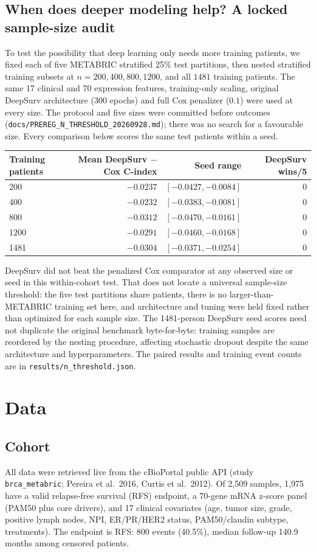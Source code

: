\documentclass[12pt,a4paper]{article}
\begin{document}
\subsection{When does deeper modeling help? A locked sample-size audit}
To test the possibility that deep learning only needs more training patients,
we fixed each of five METABRIC stratified 25\% test partitions, then nested
stratified training subsets at $n=200,400,800,1200$, and all $1481$
training patients. The same 17 clinical and 70 expression features,
training-only scaling, original DeepSurv architecture (300 epochs) and
full Cox penalizer ($0.1$) were used at every size. The protocol and five
sizes were committed before outcomes
(\texttt{docs/PREREG\_N\_THRESHOLD\_20260928.md}); there was no search
for a favourable size. Every comparison below scores the same test patients
within a seed.
\begin{center}
\begin{tabular}{lrrr}
Training patients & Mean DeepSurv $-$ Cox C-index & Seed range & DeepSurv wins/5\\
\hline
200 & $-0.0237$ & $[-0.0427,-0.0084]$ & 0\\
400 & $-0.0232$ & $[-0.0383,-0.0081]$ & 0\\
800 & $-0.0312$ & $[-0.0470,-0.0161]$ & 0\\
1200 & $-0.0291$ & $[-0.0460,-0.0168]$ & 0\\
1481 & $-0.0304$ & $[-0.0371,-0.0254]$ & 0\\
\end{tabular}
\end{center}
DeepSurv did not beat the penalized Cox comparator at any observed size or
seed in this within-cohort test. That does not locate a universal
sample-size threshold: the five test partitions share patients, there is
no larger-than-METABRIC training set here, and architecture and tuning were
held fixed rather than optimized for each sample size. The 1481-person
DeepSurv seed scores need not duplicate the original benchmark byte-for-byte:
training samples are reordered by the nesting procedure, affecting stochastic
dropout despite the same architecture and hyperparameters. The paired
results and training event counts are in \texttt{results/n\_threshold.json}.

\section{Data}
\subsection{Cohort}
All data were retrieved live from the cBioPortal public API (study
\texttt{brca\_metabric}; Pereira et al.\ 2016, Curtis et al.\ 2012). Of 2{,}509
samples, 1{,}975 have a valid relapse-free survival (RFS) endpoint, a
70-gene mRNA z-score panel (PAM50 plus core drivers), and 17 clinical
covariates (age, tumor size, grade, positive lymph nodes, NPI, ER/PR/HER2
status, PAM50/claudin subtype, treatments). The endpoint is RFS: 800 events
(40.5\%), median follow-up 140.9 months among censored patients.
\end{document}
